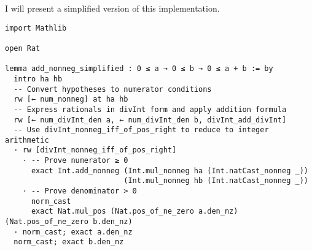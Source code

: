 \begin{example}
  I will present a simplified version of this implementation.
  \begin{lstlisting}[language=lean]
import Mathlib

open Rat 

lemma add_nonneg_simplified : 0 ≤ a → 0 ≤ b → 0 ≤ a + b := by
  intro ha hb
  -- Convert hypotheses to numerator conditions
  rw [← num_nonneg] at ha hb
  -- Express rationals in divInt form and apply addition formula
  rw [← num_divInt_den a, ← num_divInt_den b, divInt_add_divInt]
  -- Use divInt_nonneg_iff_of_pos_right to reduce to integer arithmetic
  · rw [divInt_nonneg_iff_of_pos_right]
    · -- Prove numerator ≥ 0
      exact Int.add_nonneg (Int.mul_nonneg ha (Int.natCast_nonneg _))
                           (Int.mul_nonneg hb (Int.natCast_nonneg _))
    · -- Prove denominator > 0
      norm_cast
      exact Nat.mul_pos (Nat.pos_of_ne_zero a.den_nz) (Nat.pos_of_ne_zero b.den_nz)
  · norm_cast; exact a.den_nz
  norm_cast; exact b.den_nz


\end{lstlisting}
\end{example}
